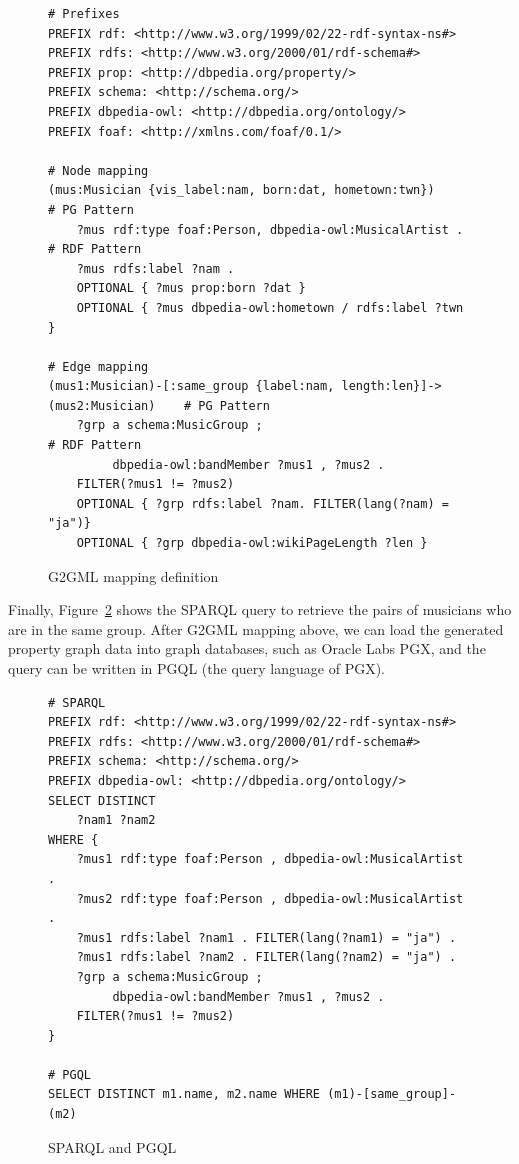 \documentclass[runningheads]{llncs}
\begin{document}
\begin{figure}[!t]
\vspace{2mm}
\begin{scriptsize}
\begin{verbatim}
# Prefixes
PREFIX rdf: <http://www.w3.org/1999/02/22-rdf-syntax-ns#>
PREFIX rdfs: <http://www.w3.org/2000/01/rdf-schema#>
PREFIX prop: <http://dbpedia.org/property/>
PREFIX schema: <http://schema.org/>
PREFIX dbpedia-owl: <http://dbpedia.org/ontology/>
PREFIX foaf: <http://xmlns.com/foaf/0.1/>

# Node mapping
(mus:Musician {vis_label:nam, born:dat, hometown:twn})                    # PG Pattern
    ?mus rdf:type foaf:Person, dbpedia-owl:MusicalArtist .                # RDF Pattern
    ?mus rdfs:label ?nam .
    OPTIONAL { ?mus prop:born ?dat }
    OPTIONAL { ?mus dbpedia-owl:hometown / rdfs:label ?twn }

# Edge mapping
(mus1:Musician)-[:same_group {label:nam, length:len}]->(mus2:Musician)    # PG Pattern
    ?grp a schema:MusicGroup ;                                            # RDF Pattern
         dbpedia-owl:bandMember ?mus1 , ?mus2 .
    FILTER(?mus1 != ?mus2)
    OPTIONAL { ?grp rdfs:label ?nam. FILTER(lang(?nam) = "ja")}
    OPTIONAL { ?grp dbpedia-owl:wikiPageLength ?len }
\end{verbatim}
\end{scriptsize}
\caption{G2GML mapping definition}
\label{fig:g2gml}
\end{figure}

Finally, Figure~\ref{fig:sparql} shows the SPARQL query to retrieve the pairs of musicians who are in the same group. After G2GML mapping above, we can load the generated property graph data into graph databases, such as Oracle Labs PGX, and the query can be written in PGQL (the query language of PGX).

\begin{figure}[!t]
\vspace{2mm}
\begin{scriptsize}
\begin{verbatim}
# SPARQL
PREFIX rdf: <http://www.w3.org/1999/02/22-rdf-syntax-ns#>
PREFIX rdfs: <http://www.w3.org/2000/01/rdf-schema#>
PREFIX schema: <http://schema.org/>
PREFIX dbpedia-owl: <http://dbpedia.org/ontology/>
SELECT DISTINCT
    ?nam1 ?nam2
WHERE {
    ?mus1 rdf:type foaf:Person , dbpedia-owl:MusicalArtist .
    ?mus2 rdf:type foaf:Person , dbpedia-owl:MusicalArtist .
    ?mus1 rdfs:label ?nam1 . FILTER(lang(?nam1) = "ja") .
    ?mus1 rdfs:label ?nam2 . FILTER(lang(?nam2) = "ja") .
    ?grp a schema:MusicGroup ;
         dbpedia-owl:bandMember ?mus1 , ?mus2 .
    FILTER(?mus1 != ?mus2)
}

# PGQL
SELECT DISTINCT m1.name, m2.name WHERE (m1)-[same_group]-(m2)
\end{verbatim}
\end{scriptsize}
\caption{SPARQL and PGQL}
\label{fig:sparql}
\end{figure}
\end{document}
